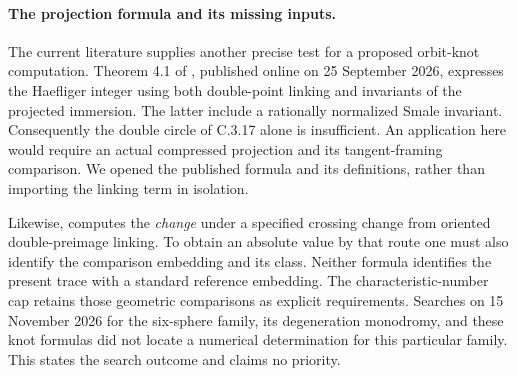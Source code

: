 \paragraph{The projection formula and its missing inputs.}
The current literature supplies another precise test for a proposed
orbit-knot computation. Theorem 4.1 of
\citet{GauniyalTurchin2026Root}, published online on
25 September 2026, expresses the Haefliger integer using both
double-point linking and invariants of the projected immersion.
The latter include a rationally normalized Smale invariant.
Consequently the double circle of C.3.17 alone is insufficient.
An application here would require an actual compressed projection
and its tangent-framing comparison. We opened the published
formula and its definitions, rather than importing the linking
term in isolation.

Likewise, \citet[Theorem 2.5]{Sakai2015Root} computes the
\emph{change} under a specified crossing change from oriented
double-preimage linking. To obtain an absolute value by that
route one must also identify the comparison embedding and its
class. Neither formula identifies the present trace with a
standard reference embedding. The characteristic-number cap
retains those geometric comparisons as explicit requirements.
Searches on 15 November 2026 for the six-sphere family,
its degeneration monodromy, and these knot formulas did not
locate a numerical determination for this particular family.
This states the search outcome and claims no priority.

